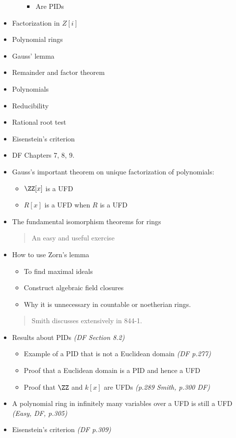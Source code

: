 \begin{itemize}
\begin{itemize}
    \begin{itemize}
    \tightlist
    \item
      Are PIDs
    \end{itemize}
  \end{itemize}
\item
  Factorization in \(Z[i]\)
\item
  Polynomial rings
\item
  Gauss' lemma
\item
  Remainder and factor theorem
\item
  Polynomials
\item
  Reducibility
\item
  Rational root test
\item
  Eisenstein's criterion
\item
  DF Chapters 7, 8, 9.
\item
  Gauss's important theorem on unique factorization of polynomials:

  \begin{itemize}
  \tightlist
  \item
    \(\ZZ[x]\) is a UFD
  \item
    \(R[x]\) is a UFD when \(R\) is a UFD
  \end{itemize}
\item
  The fundamental isomorphism theorems for rings

  \begin{quote}
  An easy and useful exercise
  \end{quote}
\item
  How to use Zorn's lemma

  \begin{itemize}
  \tightlist
  \item
    To find maximal ideals
  \item
    Construct algebraic field closures
  \item
    Why it is unnecessary in countable or noetherian rings.
  \end{itemize}

  \begin{quote}
  Smith discusses extensively in 844-1.
  \end{quote}
\item
  Results about PIDs \emph{(DF Section 8.2)}

  \begin{itemize}
  \item
    Example of a PID that is not a Euclidean domain \emph{(DF p.277)}
  \item
    Proof that a Euclidean domain is a PID and hence a UFD
  \item
    Proof that \(\ZZ\) and \(k[x]\) are UFDs \emph{(p.289 Smith, p.300
    DF)}
  \end{itemize}
\item
  A polynomial ring in infinitely many variables over a UFD is still a
  UFD \emph{(Easy, DF, p.305)}
\item
  Eisenstein's criterion \emph{(DF p.309)}


\end{itemize}
